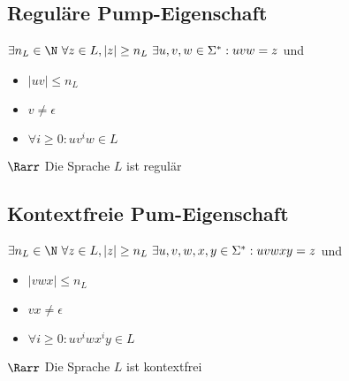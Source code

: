 \documentclass{article}
\begin{document}
\subsection{Reguläre Pump-Eigenschaft}
$\exists n_L\in\N\ \forall z\in L,|z|\geq n_L\ \exists u,v,w\in\Sigma^*:uvw=z$ und
\begin{itemize}
	\item $|uv|\leq n_L$
	\item $v\not= \epsilon$
	\item $\forall i\geq0:uv^iw\in L$
\end{itemize}
$\Rarr$ Die Sprache $L$ ist regulär
\subsection{Kontextfreie Pum-Eigenschaft}
$\exists n_L\in\N\ \forall z\in L,|z|\geq n_L\ \exists u,v,w,x,y\in\Sigma^*:uvwxy=z$ und
\begin{itemize}
	\item $|vwx|\leq n_L$
	\item $vx\not= \epsilon$
	\item $\forall i\geq0:uv^iwx^iy\in L$
\end{itemize}
$\Rarr$ Die Sprache $L$ ist kontextfrei
\end{document}
